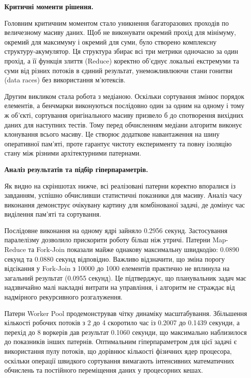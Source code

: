 \documentclass[14pt, a4paper]{extreport}
\begin{document}
	\textbf{Критичні моменти рішення.}
	
	Головним критичним моментом стало уникнення багаторазових проходів по величезному масиву даних. Щоб не виконувати окремий прохід для мінімуму, окремий для максимуму і окремий для суми, було створено комплексну структуру-акумулятор. Ця структура збирає всі три метрики одночасно за один прохід, а її функція злиття (Reduce) коректно об'єднує локальні екстремуми та суми від різних потоків в єдиний результат, унеможливлюючи стани гонитви (data races) без використання м'ютексів.
	
	Другим викликом стала робота з медіаною. Оскільки сортування змінює порядок елементів, а бенчмарки виконуються послідовно один за одним на одному і тому ж об'єкті, сортування оригінального масиву призвело б до спотворення вихідних даних для наступних тестів. Тому перед обчисленням медіани алгоритм виконує клонування всього масиву. Це створює додаткове навантаження на шину оперативної пам'яті, проте гарантує чистоту експерименту та повну ізоляцію стану між різними архітектурними патернами.
	
	\textbf{Аналіз результатів та підбір гіперпараметрів.}
	
	Як видно на скріншотах нижче, всі реалізовані патерни коректно впоралися із завданням, успішно обчисливши статистичні показники для масиву. Аналіз часу виконання демонструє очікувану картину для комбінованої задачі, де домінує час виділення пам'яті та сортування.
	
	
	Послідовне виконання на одному ядрі зайняло 0.2956 секунд. Застосування паралелізму дозволило прискорити роботу більш ніж утричі. Патерни Map-Reduce та Fork-Join показали майже однакову максимальну швидкодію: 0.0890 секунд та 0.0880 секунд відповідно. Важливо відзначити, що зміна порогу відсікання у Fork-Join з 10000 до 1000 елементів практично не вплинула на загальний результат (0.0955 секунд). Це підтверджує, що планувальник задач має надзвичайно малі накладні витрати на управління, і алгоритм не страждає від надмірного рекурсивного розгалуження.
	
	Патерн Worker Pool продемонстрував чітку динаміку масштабування. Збільшення кількості робочих потоків з 2 до 4 скоротило час із 0.2007 до 0.1439 секунди, а перехід до 8 воркерів дав результат 0.1060 секунди, що максимально наблизилося до показників інших патернів. Оптимальним гіперпараметром для цієї задачі є використання пулу потоків, що дорівнює кількості фізичних ядер процесора, оскільки операції швидкого сортування вимагають інтенсивних математичних обчислень та постійного переміщення даних у процесорних кешах.
	
\end{document}
